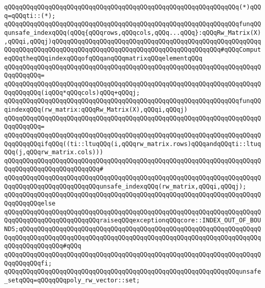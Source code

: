 \verb|qQQqqQQqqQQqqQQqqQQqqQQqqQQqqQQqqQQqqQQqqQQqqQQqqQQqqQQqqQQqqQQq(*)qQQq=qQQqti::(*);|\newline
\newline
\verb|qQQqqQQqqQQqqQQqqQQqqQQqqQQqqQQqqQQqqQQqqQQqqQQqqQQqqQQqqQQqqQQqfunqQQqunsafe_indexqQQq(qQQq{qQQqrows,qQQqcols,qQQq...qQQq}:qQQqRw_Matrix(X),qQQqi,qQQqj)qQQqqQQqqQQqqQQqqQQqqQQqqQQqqQQqqQQqqQQqqQQqqQQqqQQqqQQqqQQqqQQqqQQqqQQqqQQqqQQqqQQqqQQqqQQqqQQqqQQqqQQqqQQqqQQqqQQq#qQQqComputeqQQqtheqQQqindexqQQqofqQQqanqQQqmatrixqQQqelementqQQq|\newline
\verb|qQQqqQQqqQQqqQQqqQQqqQQqqQQqqQQqqQQqqQQqqQQqqQQqqQQqqQQqqQQqqQQqqQQqqQQqqQQqqQQq=|\newline
\verb|qQQqqQQqqQQqqQQqqQQqqQQqqQQqqQQqqQQqqQQqqQQqqQQqqQQqqQQqqQQqqQQqqQQqqQQqqQQqqQQq(iqQQq*qQQqcols)qQQq+qQQqj;|\newline
\newline
\verb|qQQqqQQqqQQqqQQqqQQqqQQqqQQqqQQqqQQqqQQqqQQqqQQqqQQqqQQqqQQqqQQqfunqQQqindexqQQq(rw_matrix:qQQqRw_Matrix(X),qQQqi,qQQqj)|\newline
\verb|qQQqqQQqqQQqqQQqqQQqqQQqqQQqqQQqqQQqqQQqqQQqqQQqqQQqqQQqqQQqqQQqqQQqqQQqqQQqqQQq=|\newline
\verb|qQQqqQQqqQQqqQQqqQQqqQQqqQQqqQQqqQQqqQQqqQQqqQQqqQQqqQQqqQQqqQQqqQQqqQQqqQQqqQQqifqQQq((ti::ltuqQQq(i,qQQqrw_matrix.rows)qQQqandqQQqti::ltuqQQq(j,qQQqrw_matrix.cols)))|\newline
\verb|qQQqqQQqqQQqqQQqqQQqqQQqqQQqqQQqqQQqqQQqqQQqqQQqqQQqqQQqqQQqqQQqqQQqqQQqqQQqqQQqqQQqqQQqqQQqqQQq#|\newline
\verb|qQQqqQQqqQQqqQQqqQQqqQQqqQQqqQQqqQQqqQQqqQQqqQQqqQQqqQQqqQQqqQQqqQQqqQQqqQQqqQQqqQQqqQQqqQQqqQQqunsafe_indexqQQq(rw_matrix,qQQqi,qQQqj);|\newline
\verb|qQQqqQQqqQQqqQQqqQQqqQQqqQQqqQQqqQQqqQQqqQQqqQQqqQQqqQQqqQQqqQQqqQQqqQQqqQQqqQQqelse|\newline
\verb|qQQqqQQqqQQqqQQqqQQqqQQqqQQqqQQqqQQqqQQqqQQqqQQqqQQqqQQqqQQqqQQqqQQqqQQqqQQqqQQqqQQqqQQqqQQqqQQqraiseqQQqexceptionqQQqcore::INDEX_OUT_OF_BOUNDS;qQQqqQQqqQQqqQQqqQQqqQQqqQQqqQQqqQQqqQQqqQQqqQQqqQQqqQQqqQQqqQQqqQQqqQQqqQQqqQQqqQQqqQQqqQQqqQQqqQQqqQQqqQQqqQQqqQQqqQQqqQQqqQQqqQQqqQQqqQQqqQQqqQQqqQQq#qQQq|\newline
\verb|qQQqqQQqqQQqqQQqqQQqqQQqqQQqqQQqqQQqqQQqqQQqqQQqqQQqqQQqqQQqqQQqqQQqqQQqqQQqqQQqfi;|\newline
\newline
\verb|qQQqqQQqqQQqqQQqqQQqqQQqqQQqqQQqqQQqqQQqqQQqqQQqqQQqqQQqqQQqqQQqunsafe_setqQQq=qQQqqQQqpoly_rw_vector::set;|\newline
